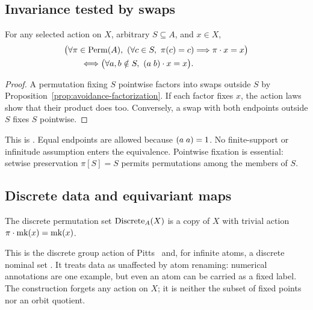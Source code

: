 \subsection{Invariance tested by swaps}
\label{sec:swap-invariance}

\begin{proposition}
\label{prop:swap-invariance}
For any selected action on $X$, arbitrary $S\subseteq A$, and $x\in X$,
\begin{align*}
  &\bigl(\forall\pi\in\operatorname{Perm}(A),\
      (\forall c\in S,\ \pi(c)=c)\Longrightarrow\pi\mathbin{\cdot} x=x\bigr)\\
  &\hspace{2em}\Longleftrightarrow
    \bigl(\forall a,b\notin S,\ (a\;b)\mathbin{\cdot} x=x\bigr).
\end{align*}
\end{proposition}

\begin{proof}
A permutation fixing $S$ pointwise factors into swaps outside $S$ by
Proposition~\ref{prop:avoidance-factorization}. If each factor fixes $x$,
the action laws show that their product does too. Conversely, a swap with
both endpoints outside $S$ fixes $S$ pointwise.
\end{proof}

This is . Equal endpoints are
allowed because $(a\;a)=1$. No finite-support or infinitude assumption
enters the equivalence. Pointwise fixation is essential: setwise
preservation $\pi[S]=S$ permits permutations among the members of $S$.

\subsection{Discrete data and equivariant maps}
\label{sec:discrete}
\label{sec:equivariance}

\begin{definition}
The discrete permutation set $\operatorname{Discrete}_A(X)$ is a copy of $X$ with trivial
action $\pi\mathbin{\cdot}\operatorname{mk}(x)=\operatorname{mk}(x)$.
\end{definition}

This is the discrete group action of Pitts~\cite[Example~1.5, p.~15]{pitts2013}
and, for infinite atoms, a discrete nominal set
\cite[Example~2.5, p.~30]{pitts2013}. It treats data as unaffected by atom
renaming: numerical annotations are one example, but even an atom can be
carried as a fixed label. The construction forgets any action on $X$;
it is neither the subset of fixed points nor an orbit quotient.

